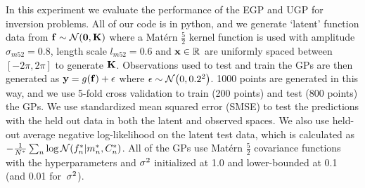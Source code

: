 \documentclass{article} %
\begin{document}
In this experiment we evaluate the performance of the EGP and UGP for inversion
problems. All of our code is in python, and we generate `latent' function data
from $\mathbf{f} \sim \mathcal{N}\!\left({\mathbf{0}, \mathbf{K}}\right)$ where a Mat\'ern $\frac{5}{2}$
kernel function is used with amplitude $\sigma_{m52} = 0.8$, length scale
$l_{m52} = 0.6$ and $\mathbf{x} \in \mathbb{R}^{}$ are uniformly spaced between $[-2\pi,
2\pi]$ to generate $\mathbf{K}$. Observations used to test and train the GPs are
then generated as $\mathbf{y} = g\!\left({{\mathbf{f}}}\right) + \epsilon$ where $\epsilon \sim
\mathcal{N}\!\left({0, 0.2^2}\right)$. 1000 points are generated in this way, and we use 5-fold
cross validation to train (200 points) and test (800 points) the GPs. We use
standardized mean squared error (SMSE) to test the predictions with the held
out data in both the latent and observed spaces. We also use held-out average
negative log-likelihood on the latent test data, which is calculated as
$-\frac{1}{N^{*}} \sum_{n} \log \mathcal{N}\!\left({f_n^{*}}\middle\vert{\ensuremath{m}_n\ensuremath{^{*}},
    \ensuremath{C}_n\ensuremath{^{*}}}\right)$. All of the GPs use Mat\'ern $\frac{5}{2}$ covariance
functions with the hyperparameters and $\sigma^2$ initialized at 1.0 and
lower-bounded at 0.1 (and 0.01 for~$\sigma^2$).
%
\end{document}
